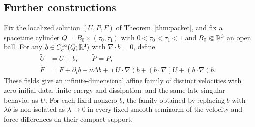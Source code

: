 \subsection{Further constructions}\label{sec:variants}
\begin{proposition}\label{prop:affine}
Fix the localized solution $(U,P,F)$ of Theorem~\ref{thm:packet}, and fix a spacetime cylinder $Q=B_0\times(\tau_0,\tau_1)$ with
$0<\tau_0<\tau_1<1$ and $B_0\Subset\mathbb R^3$ an open ball.
For any $b\in C_c^\infty(Q;\mathbb R^3)$ with $\nabla\cdot b=0$, define
\begin{align}
 \widetilde U&=U+b,\qquad \widetilde P=P,\nonumber\\
 \widetilde F&=F+\partial_tb-\nu\Delta b
       +(U\cdot\nabla)b+(b\cdot\nabla)U+(b\cdot\nabla)b.\label{eq:affine}
\end{align}
These fields give an infinite-dimensional affine family of distinct velocities with zero initial data, finite energy and dissipation, and the same late singular behavior as $U$. For each fixed nonzero $b$, the family obtained by replacing $b$ with $\lambda b$ is non-isolated as $\lambda\to0$ in every fixed smooth seminorm of the velocity and force differences on their compact support.
\end{proposition}
